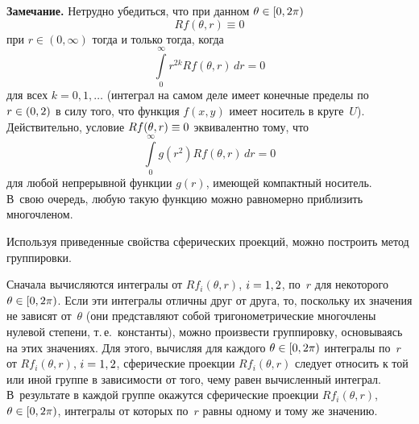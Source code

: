 \begin{multicols}{2}
\medskip

\noindent
\textbf{Замечание.} Нетрудно убедиться, что при данном $\theta\hm\in[0,2\pi)$
$$
Rf(\theta,r)\equiv0
$$ 
при $r\in(0,\infty)$ тогда и только тогда, когда 
$$
\int\limits_{0}^{\infty}r^{2k}Rf(\theta,r)\,dr=0
$$
для всех $k=0,1,\ldots$ (интеграл на самом деле имеет конечные
пределы по $r\hm\in(0,2)$ в силу того, что функция $f(x,y)$ имеет
носитель в круге~$U$). Действительно, условие $Rf(\theta,r)\hm\equiv0$
эквивалентно тому, что
$$
\int\limits_{0}^{\infty}g(r^2)Rf(\theta,r)\,dr=0
$$
для любой непрерывной функции $g(r)$, имеющей компактный носитель. 
В~свою очередь, любую такую функцию можно равномерно приблизить
многочленом.

Используя приведенные свойства сферических проекций, можно построить метод группировки.

Сначала вычисляются интегралы от $Rf_{i}(\theta,r)$, $i\hm=1,2$, по~$r$ 
для некоторого $\theta\hm\in[0,2\pi)$. Если эти интегралы отличны
друг от друга, то, поскольку их значения не зависят от~$\theta$ (они
представляют собой тригонометрические многочлены нулевой степени, т.\,е.\ 
константы), можно произвести группировку, основываясь на этих
значениях. Для этого, вычисляя для каждого $\theta\hm\in[0,2\pi)$
интегралы по~$r$ от $Rf_{i}(\theta,r)$, $i\hm=1,2$, сферические
проекции $Rf_{i}(\theta,r)$ следует относить к той или иной группе в
зависимости от того, чему равен вычисленный интеграл. В~результате в
каждой группе окажутся сферические проекции $Rf_{i}(\theta,r)$,
$\theta\hm\in[0,2\pi)$, интегралы от которых по~$r$ равны одному и тому
же зна\-чению.
{

}


\end{multicols}

